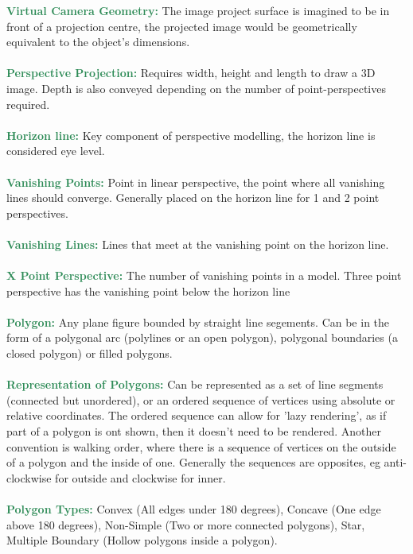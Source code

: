 \documentclass[a4paper,10pt]{article}
\begin{document}
\noindent \textcolor{SeaGreen}{\textbf{Virtual Camera Geometry:}} The image project surface is imagined to be in front of a projection centre, the projected image would be geometrically equivalent to the object's dimensions. \\ \\
\noindent \textcolor{SeaGreen}{\textbf{Perspective Projection:}} Requires width, height and length to draw a 3D image. Depth is also conveyed depending on the number of point-perspectives required.\\ \\
\noindent \textcolor{SeaGreen}{\textbf{Horizon line:}} Key component of perspective modelling, the horizon line is considered eye level. \\ \\
\noindent \textcolor{SeaGreen}{\textbf{Vanishing Points:}} Point in linear perspective, the point where all vanishing lines should converge. Generally placed on the horizon line for 1 and 2 point perspectives.\\ \\
\noindent \textcolor{SeaGreen}{\textbf{Vanishing Lines:}} Lines that meet at the vanishing point on the horizon line. \\ \\
\noindent \textcolor{SeaGreen}{\textbf{X Point Perspective:}} The number of vanishing points in a model. Three point perspective has the vanishing point below the horizon line \\ \\ 
\newpage
\noindent \textcolor{SeaGreen}{\textbf{Polygon:}} Any plane figure bounded by straight line segements. Can be in the form of a polygonal arc (polylines or an open polygon), polygonal boundaries (a closed polygon) or filled polygons. \\  \\
\noindent \textcolor{SeaGreen}{\textbf{Representation of Polygons:}} Can be represented as a set of line segments (connected but unordered), or an ordered sequence of vertices using absolute or relative coordinates. The ordered sequence can allow for 'lazy rendering', as if part of a polygon is ont shown, then it doesn't need to be rendered. Another convention is walking order, where there is a sequence of vertices on the outside of a polygon and the inside of one. Generally the sequences are opposites, eg anti-clockwise for outside and clockwise for inner. \\ \\
\noindent \textcolor{SeaGreen}{\textbf{Polygon Types:}} Convex (All edges under 180 degrees), Concave (One edge above 180 degrees), Non-Simple (Two or more connected polygons), Star, Multiple Boundary (Hollow polygons inside a polygon).  \\ \\
\end{document}
